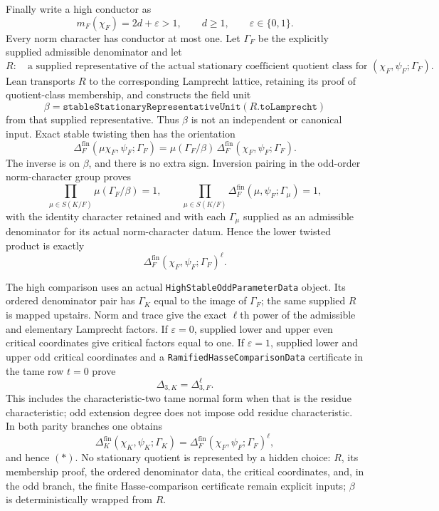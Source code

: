 \begin{theorem}
Finally write a high conductor as
\[
 m_F(\chi_F)=2d+\varepsilon>1,
 \qquad d\geq1,\qquad \varepsilon\in\{0,1\}.
\]
Every norm character has conductor at most one.  Let $\Gamma_F$ be the
explicitly supplied admissible denominator and let
\[
 R:\quad\text{a supplied representative of the actual stationary
 coefficient quotient class for }(\chi_F,\psi_F;\Gamma_F).
\]
Lean transports $R$ to the corresponding Lamprecht lattice, retaining its
proof of quotient-class membership, and constructs the field unit
\[
 \beta=
 \texttt{stableStationaryRepresentativeUnit}(R.\texttt{toLamprecht})
\]
from that supplied representative.  Thus $\beta$ is not an independent or
canonical input.  Exact stable twisting then has the orientation
\[
 \Delta_F^{\mathrm{fin}}(\mu\chi_F,\psi_F;\Gamma_F)
 =\mu(\Gamma_F/\beta)\,
  \Delta_F^{\mathrm{fin}}(\chi_F,\psi_F;\Gamma_F).
\]
The inverse is on $\beta$, and there is no extra sign.  Inversion pairing
in the odd-order norm-character group proves
\[
 \prod_{\mu\in S(K/F)}\mu(\Gamma_F/\beta)=1,
 \qquad
 \prod_{\mu\in S(K/F)}
   \Delta_F^{\mathrm{fin}}(\mu,\psi_F;\Gamma_\mu)=1,
\]
with the identity character retained and with each $\Gamma_\mu$ supplied
as an admissible denominator for its actual norm-character datum.  Hence
the lower twisted product is exactly
\[
 \Delta_F^{\mathrm{fin}}(\chi_F,\psi_F;\Gamma_F)^\ell.
\]

The high comparison uses an actual
\texttt{HighStableOddParameterData} object.  Its ordered denominator pair
has $\Gamma_K$ equal to the image of $\Gamma_F$; the same supplied $R$ is
mapped upstairs.  Norm and trace give the exact $\ell$th power of the
admissible and elementary Lamprecht factors.  If $\varepsilon=0$, supplied
lower and upper even critical coordinates give critical factors equal to
one.  If $\varepsilon=1$, supplied lower and upper odd critical coordinates
and a \texttt{RamifiedHasseComparisonData} certificate in the tame row
$t=0$ prove
\[
 \Delta_{3,K}=\Delta_{3,F}^{\ell}.
\]
This includes the characteristic-two tame normal form when that is the
residue characteristic; odd extension degree does not impose odd residue
characteristic.  In both parity branches one obtains
\[
 \Delta_K^{\mathrm{fin}}(\chi_K,\psi_K;\Gamma_K)
 =\Delta_F^{\mathrm{fin}}(\chi_F,\psi_F;\Gamma_F)^\ell,
\]
and hence $(*)$.  No stationary quotient is represented by a hidden
choice: $R$, its membership proof, the ordered denominator data, the
critical coordinates, and, in the odd branch, the finite Hasse-comparison
certificate remain explicit inputs; $\beta$ is deterministically wrapped
from $R$.


\end{theorem}
